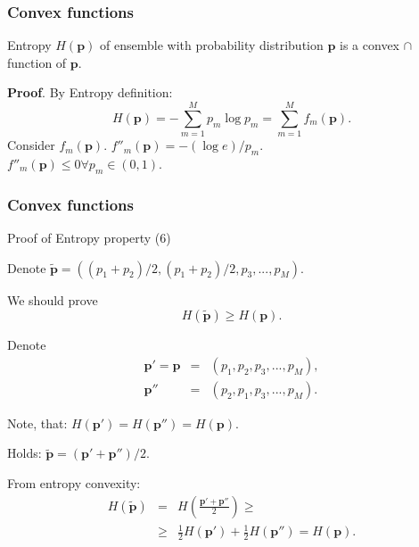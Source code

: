 \documentclass[14pt]{beamer}
\renewcommand{\vec}[1]{\ensuremath{\boldsymbol{#1}}}
\begin{document}
\begin{frame}
\frametitle{Convex functions}

    \begin{theorem}
    \label{conv_entr}
    Entropy $H(\vec p)$ of ensemble with probability distribution $\vec p$ is a convex $ \cap $ function of $\vec p$.
    \end{theorem}
    
    \textbf{Proof}. 
    By Entropy definition:
    \begin{equation}
    \label{eq7} H(\vec p) = - \sum\limits_{m = 1}^M p_m \log p_m =
    \sum\limits_{m = 1}^M f_m (\vec p) .
    \end{equation}
    Consider $f_m (\vec p)$.  $f''_m(\vec p) = -(\log e) / p_m$. \\
    $f''_m(\vec p) \le 0 \forall p_m \in (0,1)$. 
        
\end{frame}



\begin{frame}
\frametitle{Convex functions}
Proof of Entropy property (6)
\begin{itemize}
\footnotesize {

    \item Denote $\tilde {\vec  p} = \left( (p_1 + p_2 ) / 2,(p_1 + p_2 ) / 2,p_3,...,p_M \right).$ 
    
    \item We should prove
    \begin{equation}
    \label{eq8} H(\tilde {\vec p} ) \ge H(\vec p).
    \end{equation}

    \item Denote
    \begin{eqnarray}
    \vec p' = \vec p &=& (p_1 ,p_2 ,p_3 ,...,p_M ),\nonumber \\
    \vec p''         &=& (p_2 ,p_1 ,p_3 ,...,p_M ).\nonumber
    \end{eqnarray}
    
    \item Note, that:
    $H(\vec p')=H(\vec p'')=H(\vec p)$. 
    
    \item Holds:
    $\tilde{\vec p} = (\vec p'+ \vec p'') / 2$. 
    
    \item From entropy convexity:
    \begin{eqnarray}
    H(\tilde {\vec p} )&=&H\left(\frac{\vec p'+ \vec p''}{2}\right) \ge \nonumber \\ 
    &\ge& \frac{1}{2}H(\vec p') + \frac{1}{2}H(\vec p'')=H(\vec p).\nonumber
    \end{eqnarray}
}    
\end{itemize}
\end{frame}
\end{document}

